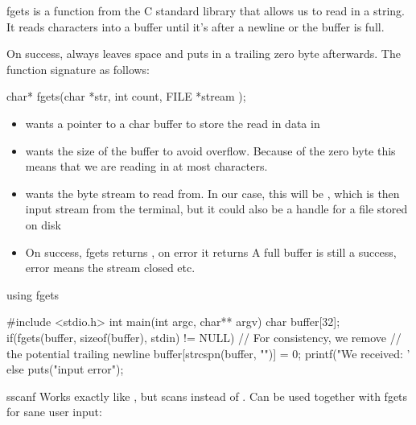 \documentclass[10pt,graphics,aspectratio=169,table]{beamer}
\begin{document}
\begin{frame}[fragile]{fgets}
     is a function from the C standard library that 
    allows us to read in a string. It reads characters into a buffer
    until it's after a newline or the buffer is full. 
    
    
    On success,  always leaves space
    and puts in a trailing zero byte afterwards. 
    The function signature as follows:

    \begin{codeblock}[numbers=none]
char* fgets(char *str, int count, FILE *stream );
    \end{codeblock}
    \begin{itemize}
        \item {} wants a pointer to a char buffer to 
            store the read in data in
        \item {} wants the size of the 
            buffer to avoid overflow. Because of the zero byte this means 
            that we are reading in at most  characters.
        \item {} wants the byte stream to read from. In our case, this
            will be , which is then input stream from the terminal,
            but it could also be a handle for a file stored on disk 
        \item On success, fgets returns , on error it returns 
              A full buffer is still a success, error means the stream closed etc.
    \end{itemize}
\end{frame}

\begin{frame}[fragile]{using fgets}
    \begin{codeblock}
#include <stdio.h>
int main(int argc, char** argv){
    char buffer[32];
    if(fgets(buffer, sizeof(buffer), stdin) != NULL){
        // For consistency, we remove 
        // the potential trailing newline
        buffer[strcspn(buffer, "\n")] = 0;
        printf("We received: '%
    }
    else{
        puts("input error");
    }
}
    \end{codeblock}
\end{frame}

\begin{frame}[fragile]{sscanf}
     Works exactly like
    , but scans  instead of . 
    Can be used together with fgets for sane user input:

\end{frame}
\end{document}
